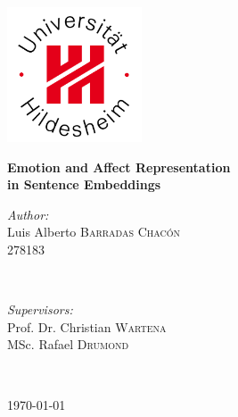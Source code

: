 \documentclass[a4paper,12pt]{report}
\begin{document}
\begin{titlepage}
\center %

\vspace{-1cm}
\includegraphics[width=4cm]{img/logoUHi.jpg}
\vspace{2cm}

{ \Large \bfseries Emotion and Affect Representation}\\
\vspace{0.5cm}
{ \Large \bfseries in Sentence Embeddings}\\
\vspace{0.5cm}
\vspace{2cm}

\begin{minipage}{0.49\textwidth}
\begin{flushleft} \large
\emph{Author:}\\
Luis Alberto \textsc{Barradas Chacón} \\
278183 \\
\end{flushleft}
\end{minipage}
~
\begin{minipage}{0.46\textwidth}
\begin{flushright} \large
\emph{Supervisors:} \\
Prof. Dr. Christian \textsc{Wartena} \\
MSc. Rafael \textsc{Drumond}
\end{flushright}
\end{minipage}\\
\vspace{2cm}

{ \today}\\ %
\vspace{1cm}


\end{titlepage}
\end{document}
